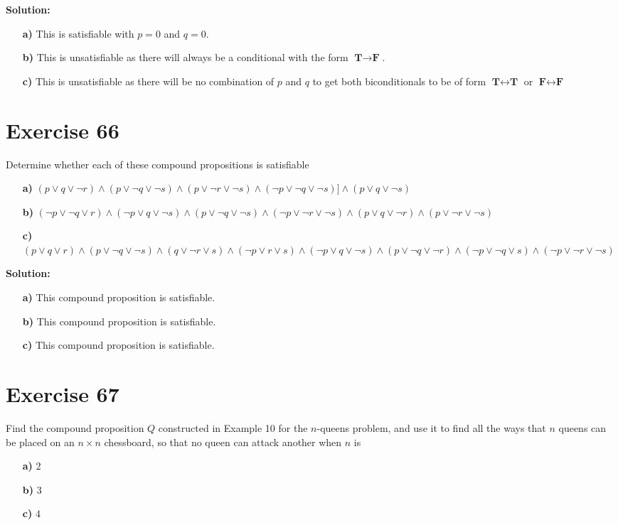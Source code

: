 \documentclass{Axon}
\begin{document}
\noindent
\textbf{Solution:}
\begin{enumerate}
    \item[\textbf{a)}] This is satisfiable with \(p = 0\) and \(q = 0\).
    \item[\textbf{b)}] This is unsatisfiable as there will always be a conditional with the form \(\textbf{T} \to \textbf{F}\).
    \item[\textbf{c)}] This is unsatisfiable as there will be no combination of \(p\) and \(q\) to get both biconditionals to be of form \(\textbf{T} \leftrightarrow \textbf{T}\) or \(\textbf{F} \leftrightarrow \textbf{F}\)
\end{enumerate}

\section*{Exercise 66}
Determine whether each of these compound propositions is satisfiable
\begin{enumerate}
    \item[\textbf{a)}] \((p \lor q \lor \lnot r) \land (p \lor \lnot q \lor \lnot s) \land (p \lor \lnot r \lor \lnot s) \land (\lnot p \lor \lnot q \lor \lnot s) ]\land (p \lor q \lor \lnot s)\)
    \item[\textbf{b)}] \((\lnot p \lor \lnot q \lor r) \land (\lnot p \lor q \lor \lnot s) \land (p \lor \lnot q \lor \lnot s) \land (\lnot p \lor \lnot r \lor \lnot s) \land (p \lor q \lor \lnot r) \land (p \lor \lnot r \lor \lnot s)\)
    \item[\textbf{c)}] \((p \lor q \lor r) \land (p \lor \lnot q \lor \lnot s) \land (q \lor \lnot r \lor s) \land (\lnot p \lor r \lor s) \land (\lnot p \lor q \lor \lnot s) \land (p \lor \lnot q \lor \lnot r) \land(\lnot p \lor \lnot q \lor s) \land (\lnot p \lor \lnot r \lor \lnot s)\)
\end{enumerate}

\noindent
\textbf{Solution:}
\begin{enumerate}
    \item[\textbf{a)}] This compound proposition is satisfiable.
    \item[\textbf{b)}] This compound proposition is satisfiable.
    \item[\textbf{c)}] This compound proposition is satisfiable.
\end{enumerate}

\section*{Exercise 67}
Find the compound proposition \(Q\) constructed in Example 10 for the \(n\)-queens problem, and use it to find all the ways that \(n\) queens can be placed on an \(n \times n\) chessboard, so that no queen can attack another when \(n\) is
\begin{enumerate}
    \item[\textbf{a)}] \(2\)
    \item[\textbf{b)}] \(3\)
    \item[\textbf{c)}] \(4\)
\end{enumerate}
\end{document}

